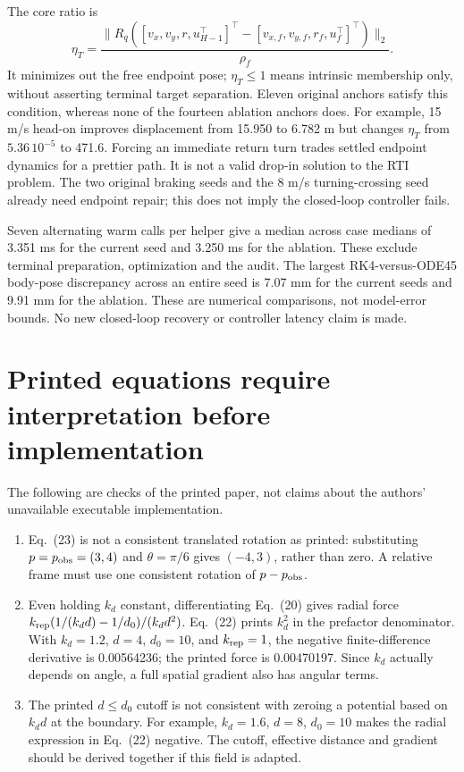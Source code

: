 \documentclass[10pt]{article}
\begin{document}
The core ratio is
\[
 \eta_T=\frac{\|R_q([v_x,v_y,r,u_{H-1}^{\top}]^\top
           -[v_{x,f},v_{y,f},r_f,u_f^\top]^\top)\|_2}{\rho_f}.
\]
It minimizes out the free endpoint pose; $\eta_T\leq1$ means intrinsic
membership only, without asserting terminal target separation. Eleven original
anchors satisfy this condition, whereas none of the fourteen ablation anchors
does. For example, 15 m/s head-on improves displacement from 15.950 to
6.782 m but changes $\eta_T$ from $5.36\,10^{-5}$ to 471.6.
Forcing an immediate return turn trades settled endpoint dynamics for a
prettier path. It is not a valid drop-in solution to the RTI problem.
The two original braking seeds and the 8 m/s turning-crossing seed already
need endpoint repair; this does not imply the closed-loop controller fails.

Seven alternating warm calls per helper give a median across case medians
of 3.351 ms for the current seed and 3.250 ms for the ablation. These exclude
terminal preparation, optimization and the audit. The largest RK4-versus-ODE45
body-pose discrepancy across an entire seed is 7.07 mm for the current seeds
and 9.91 mm for the ablation. These are numerical comparisons, not model-error
bounds. No new closed-loop recovery or controller latency claim is made.

\section{Printed equations require interpretation before implementation}
The following are checks of the printed paper, not claims about the authors'
unavailable executable implementation.

\begin{enumerate}
\item Eq.\ (23) is not a consistent translated rotation as printed:
  substituting $p=p_{\rm obs}=(3,4)$ and $\theta=\pi/6$ gives $(-4,3)$,
  rather than zero. A relative frame must use one consistent rotation of
  $p-p_{\rm obs}$.
\item Even holding $k_d$ constant, differentiating Eq.\ (20) gives radial
  force $k_{\rm rep}(1/(k_dd)-1/d_0)/(k_dd^2)$.
  Eq.\ (22) prints $k_d^2$ in the prefactor denominator. With $k_d=1.2$,
  $d=4$, $d_0=10$, and $k_{\rm rep}=1$, the negative finite-difference
  derivative is 0.00564236; the printed force is 0.00470197.
  Since $k_d$ actually depends on angle, a full spatial gradient also has
  angular terms.
\item The printed $d\leq d_0$ cutoff is not consistent with zeroing a potential
  based on $k_dd$ at the boundary. For example, $k_d=1.6$, $d=8$, $d_0=10$
  makes the radial expression in Eq.\ (22) negative. The cutoff,
  effective distance and gradient should be derived together if this
  field is adapted.
\end{enumerate}
\end{document}
